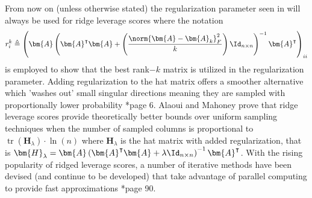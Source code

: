 From now on (unless otherwise stated) the regularization parameter seen in  will always be used for ridge leverage scores where the notation
\begin{equation*}
    r_{i}^{k} \triangleq \left( \bm{A} \left( \bm{A}^{\intercal} \bm{A} + \left( \frac{\norm{\bm{A} - \bm{A}_k}_F^{2}}{k} \right) \Id_{n \times n} \right)^{-1} \bm{A}^{\intercal} \right)_{ii}
\end{equation*}
is employed to show that the best rank$-k$ matrix is utilized in the regularization parameter. Adding regularization to the hat matrix offers a smoother alternative which 'washes out' small singular directions meaning they are sampled with proportionally lower probability \cite{DBLP:journals/corr/CohenMM15}*{page 6}. Alaoui and Mahoney \cite{NIPS2015_f3f27a32} prove that ridge leverage scores provide theoretically better bounds over uniform sampling techniques when the number of sampled columns is proportional to $\operatorname{tr} \left( \bm{H}_{\lambda} \right) \cdot \ln \left( n \right)$ where $\bm{H}_{\lambda}$ is the hat matrix with added regularization, that is $\bm{H}_{\lambda} = \bm{A} \left( \bm{A}^{\intercal} \bm{A} + \lambda \Id_{n \times n} \right)^{-1} \bm{A}^{\intercal}$. With the rising popularity of ridged leverage scores, a number of iterative methods have been devised (and continue to be developed) that take advantage of parallel computing to provide fast approximations \cite{martinsson2021randomized}*{page 90}.